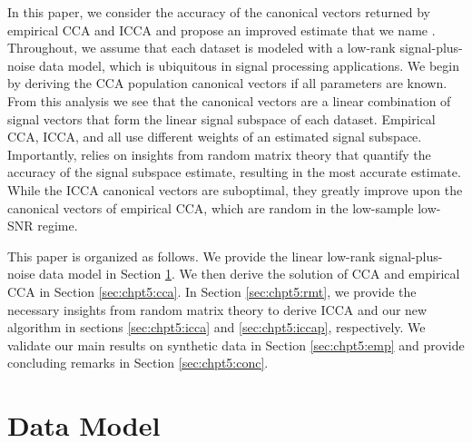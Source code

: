 In this paper, we consider the accuracy of the canonical vectors returned by empirical CCA
and ICCA and propose an improved estimate that we name \iccaps. Throughout, we assume that
each dataset is modeled with a low-rank signal-plus-noise data model, which is ubiquitous
in signal processing applications. We begin by deriving the CCA population canonical
vectors if all parameters are known. From this analysis we see that the canonical vectors
are a linear combination of signal vectors that form the linear signal subspace of each
dataset. Empirical CCA, ICCA, and \iccap all use different weights of an estimated signal
subspace. Importantly, \iccap relies on insights from random matrix theory that quantify
the accuracy of the signal subspace estimate, resulting in the most accurate
estimate. While the ICCA canonical vectors are suboptimal, they greatly improve upon the
canonical vectors of empirical CCA, which are random in the low-sample low-SNR regime.

This paper is organized as follows. We provide the linear low-rank signal-plus-noise data
model in Section \ref{sec:chpt5:model}. We then derive the solution of CCA and empirical
CCA in Section \ref{sec:chpt5:cca}. In Section \ref{sec:chpt5:rmt}, we provide the
necessary insights from random matrix theory to derive ICCA and our new algorithm \iccap
in sections \ref{sec:chpt5:icca} and \ref{sec:chpt5:iccap}, respectively. We
validate our main results on synthetic data in Section \ref{sec:chpt5:emp} and provide
concluding remarks in Section \ref{sec:chpt5:conc}.

\section{Data Model}\label{sec:chpt5:model}

